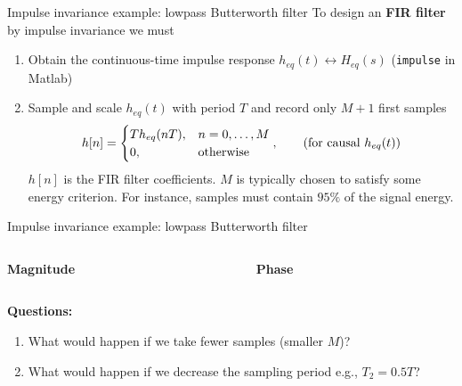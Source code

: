 \documentclass[10pt]{beamer}
\begin{document}
%
\begin{frame}{Impulse invariance example: lowpass Butterworth filter}
To design an \textbf{FIR filter} by impulse invariance we must
\begin{enumerate}
	\item Obtain the continuous-time impulse response $h_{eq}(t) \longleftrightarrow H_{eq}(s)$ (\texttt{impulse} in Matlab)
	\item Sample and scale $h_{eq}(t)$ with period $T$ and record only $M+1$ first samples 
	\begin{equation*}
		h[n] = \begin{cases}
		Th_{eq}(nT), & n = 0, \ldots, M \\
		0, & \text{otherwise}
		\end{cases}, \tag{for causal $h_{eq}(t)$}
	\end{equation*}
	$h[n]$ is the FIR filter coefficients. $M$ is typically chosen to satisfy some energy criterion. For instance, samples must contain $95\%$ of the signal energy.
\end{enumerate} 
\begin{center}
	\resizebox{0.7\linewidth}{!}{}
\end{center}

\end{frame}

%
\begin{frame}{Impulse invariance example: lowpass Butterworth filter}

\begin{columns}
	\begin{column}{0.5\textwidth}
		\textbf{Magnitude}
		\begin{center}
			\resizebox{\linewidth}{!}{}
		\end{center}
	\end{column}
	\begin{column}{0.5\textwidth}
		\textbf{Phase}
		\begin{center}
			\resizebox{\linewidth}{!}{}
		\end{center}
	\end{column}
\end{columns}

\vspace{0.2cm}
\textbf{Questions:}
\begin{enumerate}
	\item What would happen if we take fewer samples (smaller $M$)?
	\item What would happen if we decrease the sampling period e.g., $T_2 = 0.5T$?
\end{enumerate}

\end{frame}
\end{document}
